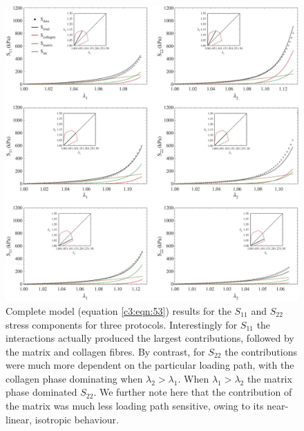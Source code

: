 \begin{figure}
\centering
\includegraphics[width=\textwidth]{Images/chapter3/F10large.jpg}
\caption{Complete model (equation \ref{c3:eqn:53}) results for the $S_{11}$ and $S_{22}$ stress components for three protocols. Interestingly for $S_{11}$ the interactions actually produced the largest contributions, followed by the matrix and collagen fibres. By contrast, for $S_{22}$ the contributions were much more dependent on the particular loading path, with the collagen phase dominating when $\lambda_2>\lambda_1$. When $\lambda_1>\lambda_2$ the matrix phase dominated $S_{22}$. We further note here that the contribution of the matrix was much less loading path sensitive, owing to its near-linear, isotropic behaviour.}
\label{c3:fig:10}
\end{figure}
